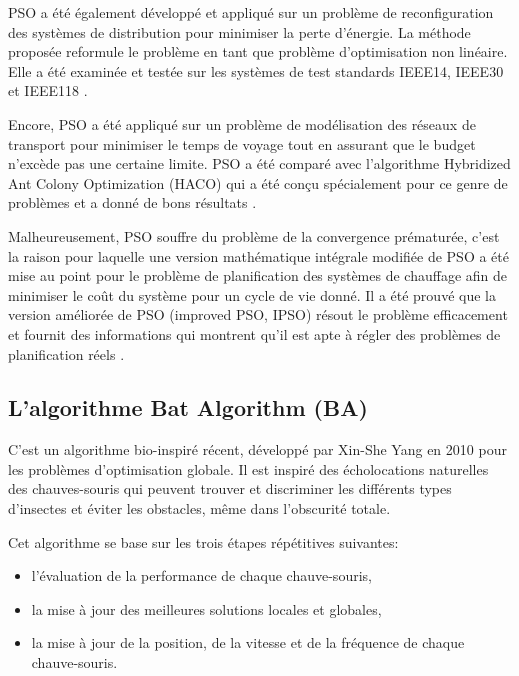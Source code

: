 \begin{spacing}{1.6}

PSO a été également développé et appliqué sur un problème de reconfiguration des systèmes de
distribution pour minimiser la perte d'énergie. La méthode proposée
reformule le problème en tant que problème d'optimisation non linéaire.
Elle a été examinée et testée sur les systèmes de test standards IEEE14,
IEEE30 et IEEE118 \cite{esmin2012application}.

\bigskip

Encore, PSO a été appliqué sur un problème de modélisation des
réseaux de transport pour minimiser le temps de voyage tout en
assurant que le budget n'excède pas une certaine limite. PSO a été
comparé avec l'algorithme Hybridized Ant Colony Optimization (HACO) qui a été conçu spécialement pour ce genre de problèmes et a donné de bons résultats \cite{babazadeh2011application}.

\bigskip

Malheureusement, PSO souffre du problème de la convergence prématurée, c'est la raison pour laquelle une version mathématique intégrale modifiée de PSO a été mise au point pour le problème de planification des systèmes de chauffage afin de minimiser le coût du système pour un
cycle de vie donné. Il a été prouvé que la version améliorée de PSO
(improved PSO, IPSO) résout le problème efficacement et fournit des
informations qui montrent qu'il est apte à régler des problèmes de
planification réels \cite{ma2013application}.

\bigskip

\subsection{L'algorithme Bat Algorithm (BA)}
C'est un algorithme bio-inspiré récent, développé par Xin-She Yang en 2010 \cite{yang2010new} pour les problèmes d'optimisation globale. Il est inspiré des écholocations naturelles des chauves-souris qui peuvent trouver et discriminer les différents types d’insectes et éviter les obstacles, même
dans l’obscurité totale.

\bigskip

Cet algorithme se base sur les trois étapes répétitives suivantes:

\bigskip
\begin{itemize}
	\item l'évaluation de la performance de chaque chauve-souris,
	\item la mise à jour des meilleures solutions locales et globales,
	\item la mise à jour de la position, de la vitesse et de la fréquence de chaque chauve-souris. 
\end{itemize}

\end{spacing}

